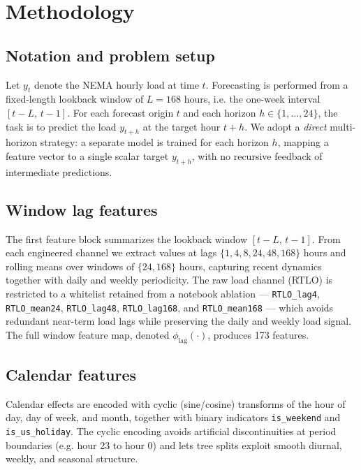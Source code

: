 \section{Methodology}\label{sec:method}

\subsection{Notation and problem setup}

Let $y_t$ denote the NEMA hourly load at time $t$. Forecasting is performed from a
fixed-length lookback window of $L = 168$ hours, i.e. the one-week interval
$[t-L,\, t-1]$. For each forecast origin $t$ and each horizon
$h \in \{1, \dots, 24\}$, the task is to predict the load $y_{t+h}$ at the target
hour $t+h$. We adopt a \emph{direct} multi-horizon strategy: a separate model is
trained for each horizon $h$, mapping a feature vector to a single scalar target
$y_{t+h}$, with no recursive feedback of intermediate predictions.

\subsection{Window lag features}

The first feature block summarizes the lookback window
$[t-L,\, t-1]$. From each engineered channel we extract values at lags
$\{1, 4, 8, 24, 48, 168\}$ hours and rolling means over windows of $\{24, 168\}$
hours, capturing recent dynamics together with daily and weekly periodicity. The
raw load channel (RTLO) is restricted to a whitelist retained from a notebook
ablation --- \texttt{RTLO\_lag4}, \texttt{RTLO\_mean24}, \texttt{RTLO\_lag48},
\texttt{RTLO\_lag168}, and \texttt{RTLO\_mean168} --- which avoids redundant
near-term load lags while preserving the daily and weekly
load signal. The full window feature map, denoted $\phi_{\mathrm{lag}}(\cdot)$,
produces 173 features.

\subsection{Calendar features}

Calendar effects are encoded with cyclic (sine/cosine) transforms of the hour of
day, day of week, and month, together with binary indicators \texttt{is\_weekend}
and \texttt{is\_us\_holiday}. The cyclic encoding avoids artificial discontinuities
at period boundaries (e.g. hour 23 to hour 0) and lets tree splits exploit smooth
diurnal, weekly, and seasonal structure.

